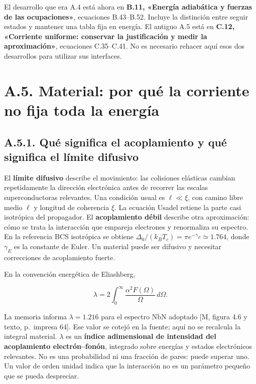 \documentclass[
  spanish,
  10pt,
  a4paper,
]{article}
\begin{document}
El desarrollo que era A.4 está ahora en \textbf{B.11, «Energía
adiabática y fuerzas de las ocupaciones»}, ecuaciones B.43--B.52.
Incluye la distinción entre seguir estados y mantener una tabla fija en
energía. El antiguo A.5 está en \textbf{C.12, «Corriente uniforme:
conservar la justificación y medir la aproximación»}, ecuaciones
C.35--C.41. No es necesario rehacer aquí esos dos desarrollos para
utilizar sus interfaces.

\section{A.5. Material: por qué la corriente no fija toda la
energía}\label{a.5.-material-por-quuxe9-la-corriente-no-fija-toda-la-energuxeda}

\subsection{A.5.1. Qué significa el acoplamiento y qué significa el
límite
difusivo}\label{a.5.1.-quuxe9-significa-el-acoplamiento-y-quuxe9-significa-el-luxedmite-difusivo}

El \textbf{límite difusivo} describe el movimiento: las colisiones
elásticas cambian repetidamente la dirección electrónica antes de
recorrer las escalas superconductoras relevantes. Una condición usual es
\(\ell\ll\xi\), con camino libre medio \(\ell\) y longitud de coherencia
\(\xi\). La ecuación Usadel retiene la parte casi isotrópica del
propagador. El \textbf{acoplamiento débil} describe otra aproximación:
cómo se trata la interacción que empareja electrones y renormaliza su
espectro. En la referencia BCS isotrópica se obtiene
\(\Delta_0/(k_BT_c)=\pi e^{-\gamma_E}\simeq1.764\), donde \(\gamma_E\)
es la constante de Euler. Un material puede ser difusivo y necesitar
correcciones de acoplamiento fuerte.

En la convención energética de Eliashberg,

\[
\lambda=2\int_0^\infty\frac{\alpha^2F(\Omega)}{\Omega}\,d\Omega.
\tag{A.32}
\]

La memoria informa \(\lambda=1.216\) para el espectro NbN adoptado {[}M,
figura 4.6 y texto, p.~impresa 64{]}. Ese valor se cotejó en la fuente;
aquí no se recalcula la integral material. \(\lambda\) es un
\textbf{índice adimensional de intensidad del acoplamiento
electrón--fonón}, integrado sobre energías y estados electrónicos
relevantes. No es una probabilidad ni una fracción de pares: puede
superar uno. Un valor de orden unidad indica que la interacción no es un
parámetro pequeño que se pueda despreciar.
\end{document}
